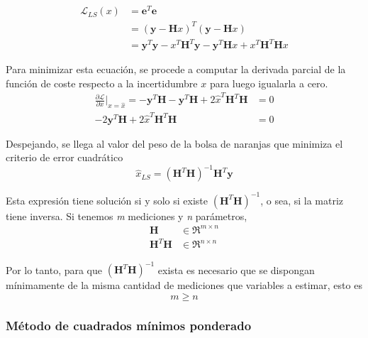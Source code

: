 \begin{align}
    \mathscr{L}_{LS}(x) &= \bm{e}^T\bm{e} \\
                        &= (\bm{y} - \bm{H}x)^T(\bm{y} - \bm{H}x) \\
                        &= \bm{y}^T\bm{y} - x^T\bm{H}^T\bm{y} - \bm{y}^T\bm{H}x + x^T\bm{H}^T\bm{H}x
\end{align}

Para minimizar esta ecuación, se procede a computar la derivada parcial de la función de coste respecto a la incertidumbre $x$ para luego igualarla a cero.
\begin{align}
    \frac{\partial \mathscr{L}}{\partial x}\bigg\rvert_{x=\hat{x}} = -\bm{y}^T\bm{H} - \bm{y}^T\bm{H} + 2\hat{x}^T\bm{H}^T\bm{H} &= 0 \\
    -2\bm{y}^T\bm{H} + 2\hat{x}^T\bm{H}^T\bm{H} &= 0
\end{align}

Despejando, se llega al valor del peso de la bolsa de naranjas que minimiza el criterio de error cuadrático
\begin{equation}
    \hat{x}_{LS} = (\bm{H}^T\bm{H})^{-1}\bm{H}^T\bm{y}
\end{equation}

Esta expresión tiene solución si y solo si existe $(\bm{H}^T\bm{H})^{-1}$, o sea, si la matriz tiene inversa. Si tenemos \textit{m} mediciones y \textit{n} parámetros,
\begin{align*}
    \bm{H} &\in \Re^{m\times n} \\
    \bm{H}^T\bm{H} &\in \Re^{n\times n}
\end{align*}

Por lo tanto, para que $(\bm{H}^T\bm{H})^{-1}$ exista es necesario que se dispongan mínimamente de la misma cantidad de mediciones que variables a estimar, esto es
\begin{equation*}
    m \geq n
\end{equation*}

\subsubsection{Método de cuadrados mínimos ponderado}

